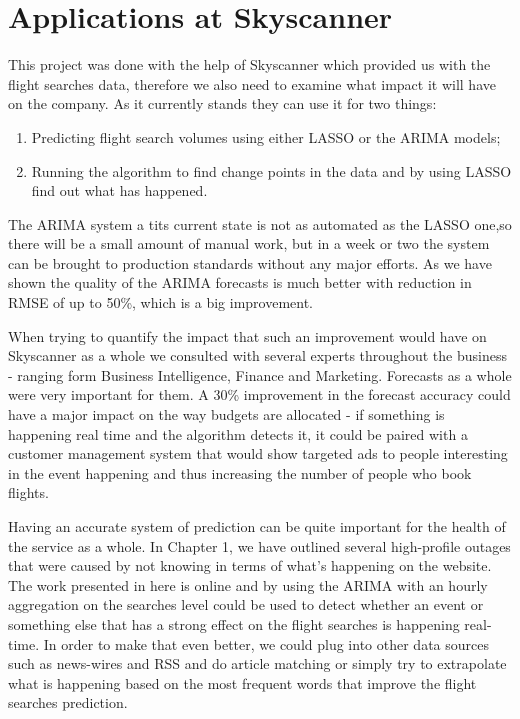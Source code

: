 \documentclass[minf,twoside,singlespacing,parskip,notimes,deptreport]{infthesis} %
\begin{document}
\section{Applications at Skyscanner}

This project was done with the help of Skyscanner which provided us with the flight searches data, therefore we also need to examine what impact it will have on the company. As it currently stands they can use it for two things:
\begin{enumerate}
\item Predicting flight search volumes using either LASSO or the ARIMA models;
\item Running the algorithm to find change points in the data and by using LASSO find out what has happened.
\end{enumerate}

The ARIMA system a tits current state is not as automated as the LASSO one,so there will be a small amount of manual work, but in a week or two the system can be brought to production standards without any major efforts. As we have shown the quality of the ARIMA forecasts is much better with reduction in RMSE of up to 50\%, which is a big improvement.

When trying to quantify the impact that such an improvement would have on Skyscanner as a whole we consulted with several experts throughout the business - ranging form Business Intelligence, Finance and Marketing. Forecasts as a whole were very important for them. A 30\% improvement in the forecast accuracy could have a major impact on the way budgets are allocated - if something is happening real time and the algorithm detects it, it could be paired with a customer management system that would show targeted ads to people interesting in the event happening and thus increasing the number of people who book flights.

Having an accurate system of prediction can be quite important for the health of the service as a whole. In Chapter 1, we have outlined several high-profile outages that were caused by not knowing in terms of what's happening on the website. The work presented in here is online and by using the ARIMA with an hourly aggregation on the searches level could be used to detect whether an event or something else that has a strong effect on the flight searches is happening real-time. In order to make that even better, we could plug into other data sources such as news-wires and RSS and do article matching or simply try to extrapolate what is happening based on the most frequent words that improve the flight searches prediction.
\end{document}
